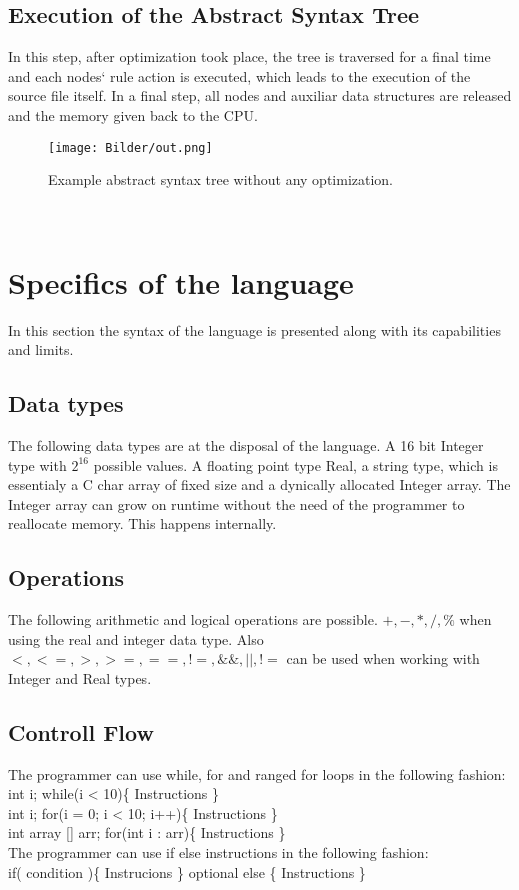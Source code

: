 \documentclass[a4paper, 11pt]{article}
\begin{document}
\subsection{Execution of the Abstract Syntax Tree}
In this step, after optimization took place, the tree is traversed for a final time and each nodes‘ rule action is executed, which leads to the execution of the source file itself. In a final step, all nodes and auxiliar data structures are released and the memory given back to the CPU.
\begin{figure} [h]
\begin{center}
\centering
\texttt{[image: Bilder/out.png]}
\caption{Example abstract syntax tree without any optimization.}
\label{AST}
\end{center}
\end{figure}\\

\section{Specifics of the language}
In this section the syntax of the language is presented along with its capabilities and limits.
\subsection{Data types}
The following data types are at the disposal of the language. A 16 bit Integer type with $ 2^{16} $ possible values. A floating point type Real, a string type, which is essentialy a C char array of fixed size and a dynically allocated Integer array. The Integer array can grow on runtime without the need of the programmer to reallocate memory. This happens internally. 
\subsection{Operations}
The following arithmetic and logical operations are possible. $ +, -, *, /, \%$ when using the real and integer data type. Also $ <, <=, >, >=, ==, !=, \&\&, ||, != $ can be used when working with Integer and Real types.
\subsection{Controll Flow}
The programmer can use while, for and ranged for loops in the following fashion: \\
int i; while(i < 10)\{ Instructions \}\\
int i; for(i = 0; i < 10; i++)\{ Instructions \}\\
int array [] arr; for(int i : arr)\{ Instructions \}\\
The programmer can use if else instructions in the following fashion:\\
if( condition )\{ Instrucions \} optional else \{ Instructions \}
\end{document}
